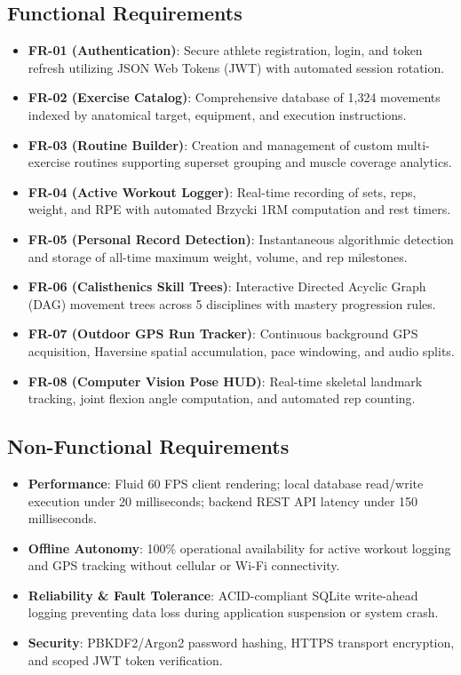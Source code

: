 \documentclass[12pt,a4paper]{report}
\begin{document}
\subsection{Functional Requirements}
\begin{itemize}
    \item \textbf{FR-01 (Authentication)}: Secure athlete registration, login, and token refresh utilizing JSON Web Tokens (JWT) with automated session rotation.
    \item \textbf{FR-02 (Exercise Catalog)}: Comprehensive database of 1,324 movements indexed by anatomical target, equipment, and execution instructions.
    \item \textbf{FR-03 (Routine Builder)}: Creation and management of custom multi-exercise routines supporting superset grouping and muscle coverage analytics.
    \item \textbf{FR-04 (Active Workout Logger)}: Real-time recording of sets, reps, weight, and RPE with automated Brzycki 1RM computation and rest timers.
    \item \textbf{FR-05 (Personal Record Detection)}: Instantaneous algorithmic detection and storage of all-time maximum weight, volume, and rep milestones.
    \item \textbf{FR-06 (Calisthenics Skill Trees)}: Interactive Directed Acyclic Graph (DAG) movement trees across 5 disciplines with mastery progression rules.
    \item \textbf{FR-07 (Outdoor GPS Run Tracker)}: Continuous background GPS acquisition, Haversine spatial accumulation, pace windowing, and audio splits.
    \item \textbf{FR-08 (Computer Vision Pose HUD)}: Real-time skeletal landmark tracking, joint flexion angle computation, and automated rep counting.
\end{itemize}

\subsection{Non-Functional Requirements}
\begin{itemize}
    \item \textbf{Performance}: Fluid 60 FPS client rendering; local database read/write execution under 20 milliseconds; backend REST API latency under 150 milliseconds.
    \item \textbf{Offline Autonomy}: 100\% operational availability for active workout logging and GPS tracking without cellular or Wi-Fi connectivity.
    \item \textbf{Reliability \& Fault Tolerance}: ACID-compliant SQLite write-ahead logging preventing data loss during application suspension or system crash.
    \item \textbf{Security}: PBKDF2/Argon2 password hashing, HTTPS transport encryption, and scoped JWT token verification.
\end{itemize}
\end{document}
